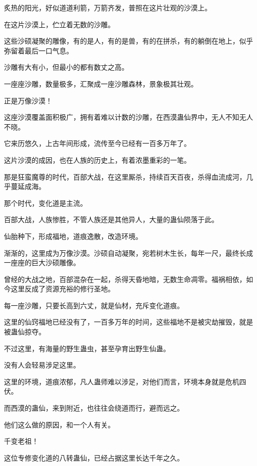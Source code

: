 
\begin{this_body}



炙热的阳光，好似道道利箭，万箭齐发，普照在这片壮观的沙漠上。

在这片沙漠上，伫立着无数的沙雕。

这些沙硕凝聚的雕像，有的是人，有的是兽，有的在拼杀，有的躺倒在地上，似乎弥留着最后一口气息。

沙雕有大有小，但最小的都有数丈之高。

一座座沙雕，数量极多，汇聚成一座沙雕森林，景象极其壮观。

正是万像沙漠！

这座沙漠覆盖面积极广，拥有着难以计数的沙雕，在西漠蛊仙界中，无人不知无人不晓。

它来历悠久，上古年间形成，流传至今已经有一百多万年了。

这片沙漠的成因，也在人族的历史上，有着浓墨重彩的一笔。

那是狂蛮魔尊的时代，百部大战，在这里厮杀，持续百天百夜，杀得血流成河，几乎蔓延成海。

那个时代，变化道是主流。

百部大战，人族惨胜，不管人族还是其他异人，大量的蛊仙陨落于此。

仙胎种下，形成福地，道痕逸散，改造环境。

渐渐的，这里成为万像沙漠。沙硕自动凝聚，宛若树木生长，每年一尺，最终长成一座座的巨大沙硕雕像。

曾经的大战之地，百部混杂在一起，杀得天昏地暗，无数生命凋零。福祸相依，如今这里反成了资源充裕的修行圣地。

每一座沙雕，只要长高到六丈，就是仙材，充斥变化道痕。

这里的仙窍福地已经没有了，一百多万年的时间，这些福地不是被灾劫摧毁，就是被蛊仙掠夺。

不过这里，有海量的野生蛊虫，甚至孕育出野生仙蛊。

没有人会轻易涉足这里。

这里的环境，道痕浓郁，凡人蛊师难以涉足，对他们而言，环境本身就是危机四伏。

而西漠的蛊仙，来到附近，也往往会绕道而行，避而远之。

他们这么做的原因，和一个人有关。

千变老祖！

这位专修变化道的八转蛊仙，已经占据这里长达千年之久。


\end{this_body}
